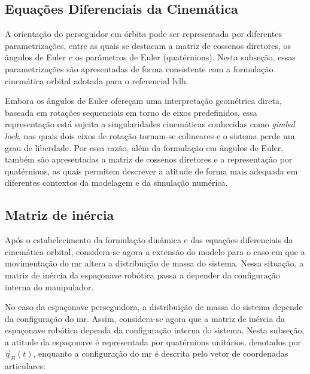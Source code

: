 \subsection{Equações Diferenciais da Cinemática}
\label{sec_equacoes_cinematica}

A orientação do perseguidor em órbita pode ser representada por diferentes parametrizações, entre as quais se destacam a matriz de cossenos diretores, os ângulos de Euler e os parâmetros de Euler (quatérnions). Nesta subseção, essas parametrizações são apresentadas de forma consistente com a formulação cinemática orbital adotada para o referencial \gls{lvlh}.

Embora os ângulos de Euler ofereçam uma interpretação geométrica direta, baseada em rotações sequenciais em torno de eixos predefinidos, essa representação está sujeita a singularidades cinemáticas conhecidas como \emph{gimbal lock}, nas quais dois eixos de rotação tornam-se colineares e o sistema perde um grau de liberdade. Por essa razão, além da formulação em ângulos de Euler, também são apresentadas a matriz de cossenos diretores e a representação por quatérnions, as quais permitem descrever a atitude de forma mais adequada em diferentes contextos da modelagem e da simulação numérica.




\subsection{Matriz de inércia}
\label{sec_matriz_inercia_variavel}

Após o estabelecimento da formulação dinâmica e das equações diferenciais da cinemática orbital, considera-se agora a extensão do modelo para o caso em que a movimentação do \gls{mr} altera a distribuição de massa do sistema. Nessa situação, a matriz de inércia da espaçonave robótica passa a depender da configuração interna do manipulador.

No caso da espaçonave perseguidora, a distribuição de massa do sistema depende da configuração do \gls{mr}. Assim, considera-se agora que a matriz de inércia da espaçonave robótica dependa da configuração interna do sistema. Nesta subseção, a atitude da espaçonave é representada por quatérnions unitários, denotados por $\vec{q}_B(t)$, enquanto a configuração do \gls{mr} é descrita pelo vetor de coordenadas articulares:

